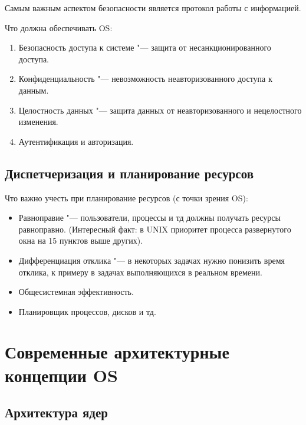 \documentclass[bachelor, och, book]{SCWorks}
\theoremstyle{remark}
\begin{document}
    Самым важным аспектом безопасности является протокол работы с информацией.

    Что должна обеспечивать OS:

    \begin{enumerate}
        \item Безопасность доступа к системе "--- защита от несанкционированного доступа.
        \item Конфиденциальность "--- невозможность неавторизованного доступа к данным.
        \item Целостность данных "--- защита данных от неавторизованного и нецелостного изменения.
        \item Аутентификация и авторизация.
    \end{enumerate}

    \subsection{Диспетчеризация и планирование ресурсов}

    Что важно учесть при планирование ресурсов (с точки зрения OS):

    \begin{itemize}[label=$\bullet$]
        \item Равноправие "--- пользователи, процессы и тд должны получать ресурсы равноправно. (Интересный факт: в UNIX приоритет процесса развернутого окна на 15 пунктов выше других).
        \item Дифференциация отклика "--- в некоторых задачах нужно понизить время отклика, к примеру в задачах выполняющихся в реальном времени.
        \item Общесистемная эффективность.
        \item Планировщик процессов, дисков и тд.
    \end{itemize}


    \section{Современные архитектурные концепции OS}

    \subsection{Архитектура ядер}
\end{document}
